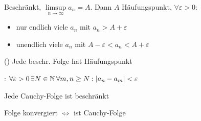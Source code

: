 \Satz Beschränkt, $\limsup\limits_{n\to\infty}a_n = A$. Dann $A$ Häufungspunkt,  $\forall\varepsilon > 0$:
\vspace{-0.6em}
\begin{itemize}
    \item nur endlich viele $a_n$ mit $a_n > A + \varepsilon$
    \item unendlich viele $a_n$ mit $A - \varepsilon < a_n < A + \varepsilon$
\end{itemize}

\Kor () Jede beschr. Folge hat Häufungspunkt

\Def {}: $\forall \varepsilon > 0 \, \exists N \in \mathbb{N} \, \forall m, n\ge N : |a_n - a_m| < \varepsilon$

\Satz Jede Cauchy-Folge ist beschränkt

\Satz Folge konvergiert $\iff$ ist Cauchy-Folge
